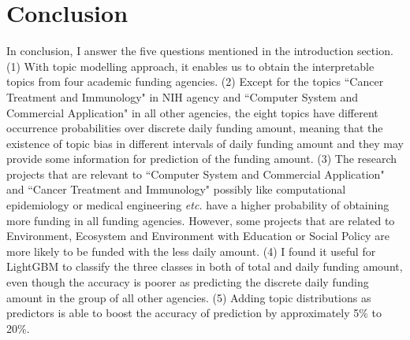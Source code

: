 \section{Conclusion}

In conclusion, I answer the five questions mentioned in the introduction section. (1) With topic modelling approach, it enables us to obtain the interpretable topics from four academic funding agencies. (2) Except for the topics ``Cancer Treatment and Immunology" in NIH agency and ``Computer System and Commercial Application" in all other agencies, the eight topics have different occurrence probabilities over discrete daily funding amount, meaning that the existence of topic bias in different intervals of daily funding amount and they may provide some information for prediction of the funding amount. (3) The research projects that are relevant to  ``Computer System and Commercial Application" and ``Cancer Treatment and Immunology" possibly like computational epidemiology or medical engineering \textit{etc.} have a higher probability of obtaining more funding in all funding agencies. However, some projects that are related to Environment, Ecosystem and Environment with Education or Social Policy are more likely to be funded with the less daily amount. (4) I found it useful for LightGBM to classify the three classes in both of total and daily funding amount, even though the accuracy is poorer as predicting the discrete daily funding amount in the group of all other agencies. (5) Adding topic distributions as predictors is able to boost the accuracy of prediction by approximately 5\% to 20\%.
